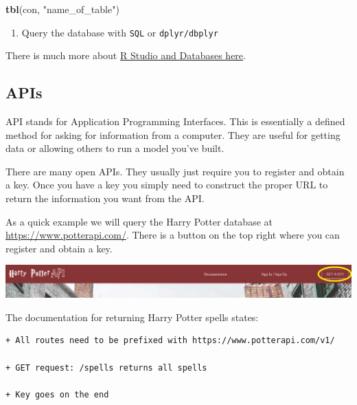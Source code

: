 \documentclass[
]{book}
\newenvironment{Shaded}{\begin{snugshade}}{\end{snugshade}}
\newcommand{\KeywordTok}[1]{\textcolor[rgb]{0.13,0.29,0.53}{\textbf{#1}}}
\newcommand{\NormalTok}[1]{#1}
\newcommand{\StringTok}[1]{\textcolor[rgb]{0.31,0.60,0.02}{#1}}
\providecommand{\tightlist}{%
  \setlength{\itemsep}{0pt}\setlength{\parskip}{0pt}}
\theoremstyle{definition}
\theoremstyle{definition}
\theoremstyle{definition}
\theoremstyle{remark}
\begin{document}
\begin{Shaded}
\begin{Highlighting}[]
\KeywordTok{tbl}\NormalTok{(con, }\StringTok{"name_of_table"}\NormalTok{)}
\end{Highlighting}
\end{Shaded}

\begin{enumerate}
\def\labelenumi{\arabic{enumi}.}
\setcounter{enumi}{2}
\tightlist
\item
  Query the database with \texttt{SQL} or \texttt{dplyr/dbplyr}
\end{enumerate}

There is much more about \href{https://db.rstudio.com/}{R Studio and Databases here}.

\hypertarget{apis-1}{%
\subsection{APIs}\label{apis-1}}

API stands for Application Programming Interfaces. This is essentially a defined method for asking for information from a computer. They are useful for getting data or allowing others to run a model you've built.

There are many open APIs. They usually just require you to register and obtain a key. Once you have a key you simply need to construct the proper URL to return the information you want from the API.

As a quick example we will query the Harry Potter database at \url{https://www.potterapi.com/}. There is a button on the top right where you can register and obtain a key.

\begin{center}\includegraphics[width=0.8\linewidth]{img/HPAPI} \end{center}

The documentation for returning Harry Potter spells states:

\begin{verbatim}
+ All routes need to be prefixed with https://www.potterapi.com/v1/  

+ GET request: /spells returns all spells 

+ Key goes on the end  
\end{verbatim}
\end{document}
